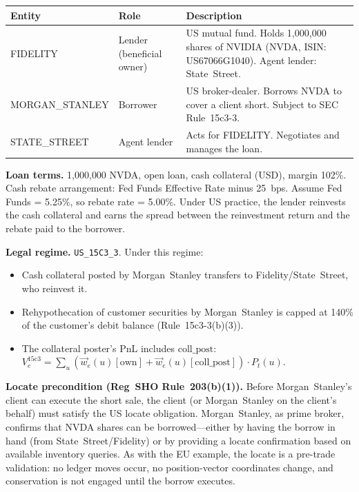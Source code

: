 \documentclass[11pt,a4paper]{article}
\begin{document}
\begin{center}\small
\begin{tabular}{l l p{7.5cm}}
\toprule
\textbf{Entity} & \textbf{Role} & \textbf{Description} \\
\midrule
FIDELITY & Lender (beneficial owner) & US mutual fund. Holds 1{,}000{,}000 shares of NVIDIA (NVDA, ISIN: US67066G1040). Agent lender: State~Street. \\
MORGAN\_STANLEY & Borrower & US broker-dealer. Borrows NVDA to cover a client short. Subject to SEC Rule~15c3-3. \\
STATE\_STREET & Agent lender & Acts for FIDELITY. Negotiates and manages the loan. \\
\bottomrule
\end{tabular}
\end{center}

\noindent\textbf{Loan terms.} 1{,}000{,}000 NVDA, open loan, cash collateral (USD), margin 102\%. Cash rebate arrangement: Fed Funds Effective Rate minus 25~bps. Assume Fed Funds = 5.25\%, so rebate rate = 5.00\%. Under US practice, the lender reinvests the cash collateral and earns the spread between the reinvestment return and the rebate paid to the borrower.

\medskip
\noindent\textbf{Legal regime.} \texttt{US\_15C3\_3}. Under this regime:
\begin{itemize}[nosep]
\item Cash collateral posted by Morgan~Stanley transfers to Fidelity/State~Street, who reinvest it.
\item Rehypothecation of customer securities by Morgan~Stanley is capped at 140\% of the customer's debit balance (Rule~15c3-3(b)(3)).
\item The collateral poster's PnL includes $\mathrm{coll\_post}$: $V_e^{\mathrm{15c3}} = \sum_u (\vec{w}_e(u)[\mathrm{own}] + \vec{w}_e(u)[\mathrm{coll\_post}]) \cdot P_t(u)$.
\end{itemize}

\medskip
\noindent\textbf{Locate precondition (Reg~SHO Rule~203(b)(1)).} Before Morgan~Stanley's client can execute the short sale, the client (or Morgan~Stanley on the client's behalf) must satisfy the US locate obligation. Morgan~Stanley, as prime broker, confirms that NVDA shares can be borrowed---either by having the borrow in hand (from State~Street/Fidelity) or by providing a locate confirmation based on available inventory queries. As with the EU example, the locate is a pre-trade validation: no ledger moves occur, no position-vector coordinates change, and conservation is not engaged until the borrow executes.
\end{document}
